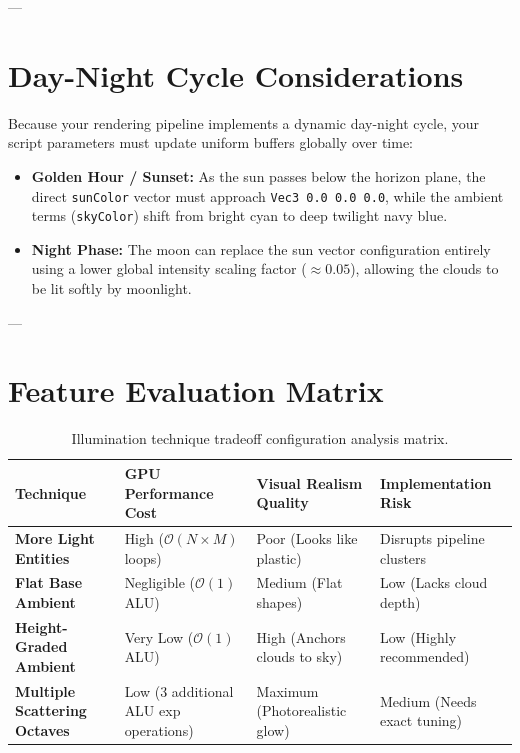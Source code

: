 \documentclass[11pt,a4paper]{article}
\begin{document}
---

\section{Day-Night Cycle Considerations}
Because your rendering pipeline implements a dynamic day-night cycle, your script parameters must update uniform buffers globally over time:
\begin{itemize}
    \item \textbf{Golden Hour / Sunset:} As the sun passes below the horizon plane, the direct \texttt{sunColor} vector must approach \texttt{Vec3 0.0 0.0 0.0}, while the ambient terms (\texttt{skyColor}) shift from bright cyan to deep twilight navy blue.
    \item \textbf{Night Phase:} The moon can replace the sun vector configuration entirely using a lower global intensity scaling factor ($\approx 0.05$), allowing the clouds to be lit softly by moonlight.
\end{itemize}

---

\section{Feature Evaluation Matrix}

\begin{table}[h!]
\centering
\small
\begin{tabular}{llll}
\toprule
\textbf{Technique} & \textbf{GPU Performance Cost} & \textbf{Visual Realism Quality} & \textbf{Implementation Risk} \\ \midrule
\textbf{More Light Entities} & High ($\mathcal{O}(N \times M)$ loops) & Poor (Looks like plastic) & Disrupts pipeline clusters \\
\textbf{Flat Base Ambient} & Negligible ($\mathcal{O}(1)$ ALU) & Medium (Flat shapes) & Low (Lacks cloud depth) \\
\textbf{Height-Graded Ambient} & Very Low ($\mathcal{O}(1)$ ALU) & High (Anchors clouds to sky) & Low (Highly recommended) \\
\textbf{Multiple Scattering Octaves} & Low (3 additional ALU exp operations) & Maximum (Photorealistic glow) & Medium (Needs exact tuning) \\ \bottomrule
\end{tabular}
\caption{Illumination technique tradeoff configuration analysis matrix.}
\end{table}
\end{document}
